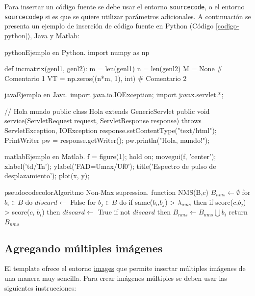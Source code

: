 	Para insertar un código fuente se debe usar el entorno \texttt{sourcecode}, o el entorno \texttt{sourcecodep} si es que se quiere utilizar parámetros adicionales. A continuación se presenta un ejemplo de inserción de código fuente en Python (Código \ref{codigo-python}), Java y Matlab:

\begin{sourcecode}[\label{codigo-python}]{python}{Ejemplo en Python.}
import numpy as np

def incmatrix(genl1, genl2):
	m = len(genl1)
	n = len(genl2)
	M = None # Comentario 1
	VT = np.zeros((n*m, 1), int) # Comentario 2
\end{sourcecode}

\begin{sourcecode}[]{java}{Ejemplo en Java.}
import java.io.IOException;
import javax.servlet.*;

// Hola mundo
public class Hola extends GenericServlet {
	public void service(ServletRequest request, ServletResponse response)
	throws ServletException, IOException{
		response.setContentType("text/html");
		PrintWriter pw = response.getWriter();
		pw.println("Hola, mundo!");
	}
}
\end{sourcecode}

\begin{sourcecode}{matlab}{Ejemplo en Matlab.}
f = figure(1); hold on;
movegui(f, 'center');
xlabel('td/Tn');
ylabel('FAD=Umax/Uf0');
title('Espectro de pulso de desplazamiento');
plot(x, y);
\end{sourcecode}

\begin{sourcecode}{pseudocodecolor}{Algoritmo Non-Max supression.}
function NMS(B,c)
	$B_{nms} \leftarrow \emptyset$
	for $b_i \in B$ do
		$discard \leftarrow$ False
		for $b_j \in B$ do
			if same($b_i$,$b_j$) > $\lambda_{nms}$ then
				if score($c$,$b_j$) > score($c$, $b_i$) then
					$discard \leftarrow$ True
		if not $discard$ then
			$B_{nms} \leftarrow B_{nms} \bigcup b_i$
	return $B_{nms}$
\end{sourcecode}

\subsection{Agregando múltiples imágenes}

	El template ofrece el entorno \href{https://template-latex.github.io/informe.html#hlp-images}{images} que permite insertar múltiples imágenes de una manera muy sencilla. Para crear imágenes múltiples se deben usar las siguientes instrucciones:

